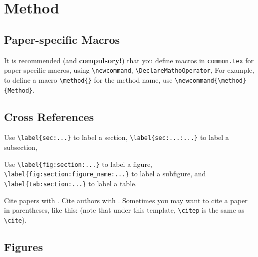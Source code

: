 \section{Method}\label{sec:method}

\subsection{Paper-specific Macros}\label{sub:method:macros}

It is recommended (and \textbf{compulsory!})
that you define macros
in \verb|common.tex|
for paper-specific macros,
using \verb|\newcommand|, \verb|\DeclareMathoOperator|, \etc{}
For example,
to define a macro \verb|\method{}| for the method name,
use \verb|\newcommand{\method}{Method}|.


\subsection{Cross References}\label{sub:method:crossref}

Use \verb|\label{sec:...}|
to label a section,
\verb|\label{sec:...:...}|
to label a subsection,
\etc{}

Use \verb|\label{fig:section:...}| to label a figure,
\verb|\label{fig:section:figure_name:...}| to label a subfigure,
and \verb|\label{tab:section:...}| to label a table.

Cite papers with \cite{author19shorthand}.
Cite authors with \citet{author19shorthand}.
Sometimes you may want to cite a paper
in parentheses,
like this: \citep{author19shorthand}
(note that under this template,
\verb|\citep| is the same as \verb|\cite|).

\subsection{Figures}\label{sub:method:figures}

